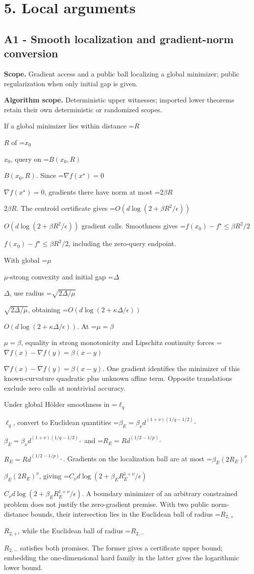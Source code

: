\documentclass[10pt,a4paper]{article}
\newcommand{\AtlasMath}[1]{\par\begingroup\centering\setbox0=\hbox{$\displaystyle #1$}\ifdim\wd0>1.4\linewidth\typeout{ATLAS WIDE FORMULA: \the\wd0}\fi\ifdim\wd0>\linewidth\resizebox{\linewidth}{!}{\box0}\else\box0\fi\par\endgroup}
\newcommand{\AtlasInlineMath}[1]{\begingroup\setbox0=\hbox{$#1$}\ifdim\wd0>.4\linewidth\endgroup\AtlasMath{#1}\else\endgroup$#1$\fi}
\begin{document}
\section{5. Local arguments}
\subsection{A1 - Smooth localization and gradient-norm conversion}
\textbf{Scope.} Gradient access and a public ball localizing a global minimizer; public regularization when only initial gap is given.

\textbf{Algorithm scope.} Deterministic upper witnesses; imported lower theorems retain their own deterministic or randomized scopes.

If a global minimizer lies within distance \AtlasInlineMath{R} of \AtlasInlineMath{x_0}, query on \AtlasInlineMath{B(x_0,R)}. Since \AtlasInlineMath{\nabla f(x^\star)=0}, gradients there have norm at most \AtlasInlineMath{2\beta R}. The centroid certificate gives \AtlasInlineMath{O(d\log(2+\beta R^2/\epsilon))} gradient calls. Smoothness gives \AtlasInlineMath{f(x_0)-f^\star\le\beta R^2/2}, including the zero-query endpoint.

With global \AtlasInlineMath{\mu}-strong convexity and initial gap \AtlasInlineMath{\Delta}, use radius \AtlasInlineMath{\sqrt{2\Delta/\mu}}, obtaining \AtlasInlineMath{O(d\log(2+\kappa\Delta/\epsilon))}. At \AtlasInlineMath{\mu=\beta}, equality in strong monotonicity and Lipschitz continuity forces \AtlasInlineMath{\nabla f(x)-\nabla f(y)=\beta(x-y)}. One gradient identifies the minimizer of this known-curvature quadratic plus unknown affine term. Opposite translations exclude zero calls at nontrivial accuracy.

Under global Hölder smoothness in \AtlasInlineMath{\ell_q}, convert to Euclidean quantities
\AtlasInlineMath{\beta_E=\beta_\nu d^{(1+\nu)(1/q-1/2)_+}} and
\AtlasInlineMath{R_E=Rd^{(1/2-1/p)_+}}. Gradients on the localization ball are at most \AtlasInlineMath{\beta_E(2R_E)^\nu}, giving
\AtlasInlineMath{C_\nu d\log(2+\beta_E R_E^{1+\nu}/\epsilon)}.
A boundary minimizer of an arbitrary constrained problem does not justify the zero-gradient premise. With two public norm-distance bounds, their intersection lies in the Euclidean ball of radius \AtlasInlineMath{R_{2,+}}, while the Euclidean ball of radius \AtlasInlineMath{R_{2,-}} satisfies both promises. The former gives a certificate upper bound; embedding the one-dimensional hard family in the latter gives the logarithmic lower bound.
\end{document}
